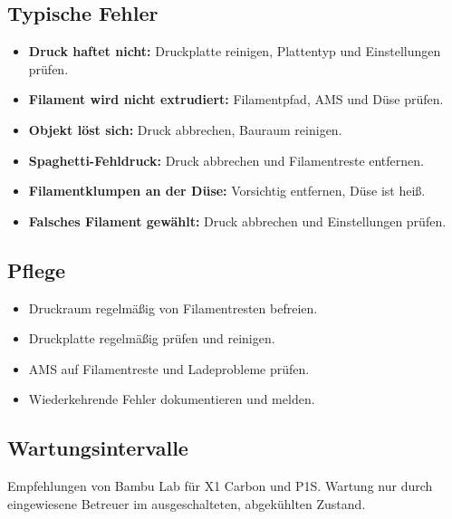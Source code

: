 \documentclass{\basedir/fablab-document}
\begin{document}
	\subsection{Typische Fehler}
	
	\begin{itemize}
		\item \textbf{Druck haftet nicht:} Druckplatte reinigen, Plattentyp und Einstellungen prüfen.
		\item \textbf{Filament wird nicht extrudiert:} Filamentpfad, AMS und Düse prüfen.
		\item \textbf{Objekt löst sich:} Druck abbrechen, Bauraum reinigen.
		\item \textbf{Spaghetti-Fehldruck:} Druck abbrechen und Filamentreste entfernen.
		\item \textbf{Filamentklumpen an der Düse:} Vorsichtig entfernen, Düse ist heiß.
		\item \textbf{Falsches Filament gewählt:} Druck abbrechen und Einstellungen prüfen.
	\end{itemize}
	
	\subsection{Pflege}
	
	\begin{itemize}
		\item Druckraum regelmäßig von Filamentresten befreien.
		\item Druckplatte regelmäßig prüfen und reinigen.
		\item AMS auf Filamentreste und Ladeprobleme prüfen.
		\item Wiederkehrende Fehler dokumentieren und melden.
	\end{itemize}
	
	\subsection{Wartungsintervalle}
	
	Empfehlungen von Bambu Lab für X1 Carbon und P1S. Wartung nur durch eingewiesene Betreuer im ausgeschalteten, abgekühlten Zustand.
	
\end{document}
